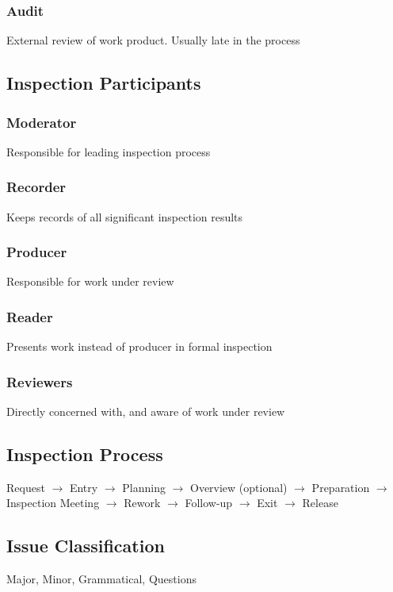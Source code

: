 \documentclass[10pt,a4paper]{article}
\begin{document}
\begin{landscape}
\begin{multicols}{3}
\subsubsection{Audit}
External review of work product. Usually late in the process
\subsection{Inspection Participants}
\subsubsection{Moderator}
Responsible for leading inspection process
\subsubsection{Recorder}
Keeps records of all significant inspection results
\subsubsection{Producer}
Responsible for work under review
\subsubsection{Reader}
Presents work instead of producer in formal inspection
\subsubsection{Reviewers}
Directly concerned with, and aware of work under review
\subsection{Inspection Process}
Request $\rightarrow$ Entry $\rightarrow$ Planning $\rightarrow$ Overview (optional) $\rightarrow$ Preparation $\rightarrow$ Inspection Meeting $\rightarrow$ Rework $\rightarrow$ Follow-up $\rightarrow$ Exit $\rightarrow$ Release
\subsection{Issue Classification}
Major, Minor, Grammatical, Questions

\end{multicols}
\end{landscape}
\end{document}
